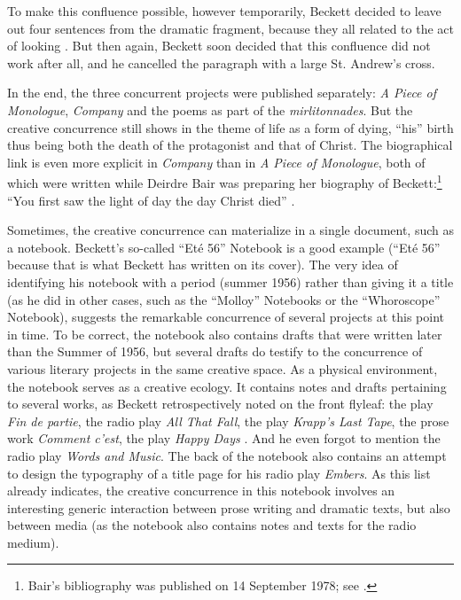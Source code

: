 \begin{paper}
\noindent To make this confluence possible, however temporarily, Beckett decided
to leave out four sentences from the dramatic fragment, because they all
related to the act of looking \citep[211]{engelberts_defis_2001}. But then again,
Beckett soon decided that this confluence did not work after all, and he
cancelled the paragraph with a large St. Andrew's cross.

In the end, the three concurrent projects were published separately:
\emph{A Piece of Monologue}, \emph{Company} and the poems as part of the
\emph{mirlitonnades}. But the creative concurrence still shows in the
theme of life as a form of dying, ``his'' birth thus being both the death
of the protagonist and that of Christ. The biographical link is even
more explicit in \emph{Company} than in \emph{A Piece of Monologue},
both of which were written while Deirdre Bair was preparing her
biography of Beckett:\footnote{Bair's bibliography was published on 14 September 1978; see \citealt[207]{pilling_samuel_2016}.} ``You first saw the light of day the day Christ died'' \citep[9]{beckett_company_2009}.

Sometimes, the creative concurrence can materialize in a single
document, such as a notebook. Beckett's so-called ``Eté 56'' Notebook is a
good example (``Eté 56'' because that is what Beckett has written on its
cover). The very idea of identifying his notebook with a period (summer
1956) rather than giving it a title (as he did in other cases, such as
the ``Molloy'' Notebooks or the ``Whoroscope'' Notebook), suggests the
remarkable concurrence of several projects at this point in time. To be
correct, the notebook also contains drafts that were written later than
the Summer of 1956, but several drafts do testify to the concurrence of
various literary projects in the same creative space. As a physical
environment, the notebook serves as a creative ecology. It contains
notes and drafts pertaining to several works, as Beckett retrospectively
noted on the front flyleaf: the play \emph{Fin de partie}, the radio
play \emph{All That Fall}, the play \emph{Krapp's Last Tape}, the prose
work \emph{Comment c'est}, the play \emph{Happy Days} . And he even forgot to mention the radio play
\emph{Words and Music}. The back of the notebook also contains an
attempt to design the typography of a title page for his radio play
\emph{Embers}. As this list already indicates, the creative concurrence
in this notebook involves an interesting generic interaction between
prose writing and dramatic texts, but also between media (as the
notebook also contains notes and texts for the radio medium).


\end{paper}
